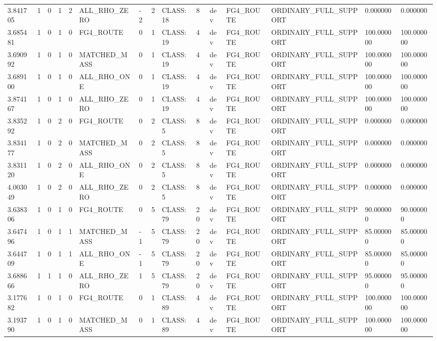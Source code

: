 \begin{tabular}{lllllllllllllll}
3.841705 & 1 & 0 & 1 & 2 & ALL\_RHO\_ZERO & -2 & 2 & CLASS:18 & 8 & dev & FG4\_ROUTE & ORDINARY\_FULL\_SUPPORT & 0.000000 & 0.000000 \\
3.685481 & 1 & 0 & 1 & 0 & FG4\_ROUTE & 0 & 1 & CLASS:19 & 4 & dev & FG4\_ROUTE & ORDINARY\_FULL\_SUPPORT & 100.000000 & 100.000000 \\
3.690992 & 1 & 0 & 1 & 0 & MATCHED\_MASS & 0 & 1 & CLASS:19 & 4 & dev & FG4\_ROUTE & ORDINARY\_FULL\_SUPPORT & 100.000000 & 100.000000 \\
3.689100 & 1 & 0 & 1 & 0 & ALL\_RHO\_ONE & 0 & 1 & CLASS:19 & 4 & dev & FG4\_ROUTE & ORDINARY\_FULL\_SUPPORT & 100.000000 & 100.000000 \\
3.874167 & 1 & 0 & 1 & 0 & ALL\_RHO\_ZERO & 0 & 1 & CLASS:19 & 4 & dev & FG4\_ROUTE & ORDINARY\_FULL\_SUPPORT & 100.000000 & 100.000000 \\
3.835292 & 1 & 0 & 2 & 0 & FG4\_ROUTE & 0 & 2 & CLASS:5 & 8 & dev & FG4\_ROUTE & ORDINARY\_FULL\_SUPPORT & 0.000000 & 0.000000 \\
3.834177 & 1 & 0 & 2 & 0 & MATCHED\_MASS & 0 & 2 & CLASS:5 & 8 & dev & FG4\_ROUTE & ORDINARY\_FULL\_SUPPORT & 0.000000 & 0.000000 \\
3.831120 & 1 & 0 & 2 & 0 & ALL\_RHO\_ONE & 0 & 2 & CLASS:5 & 8 & dev & FG4\_ROUTE & ORDINARY\_FULL\_SUPPORT & 0.000000 & 0.000000 \\
4.003049 & 1 & 0 & 2 & 0 & ALL\_RHO\_ZERO & 0 & 2 & CLASS:5 & 8 & dev & FG4\_ROUTE & ORDINARY\_FULL\_SUPPORT & 0.000000 & 0.000000 \\
3.638306 & 1 & 0 & 1 & 0 & FG4\_ROUTE & 0 & 5 & CLASS:79 & 20 & dev & FG4\_ROUTE & ORDINARY\_FULL\_SUPPORT & 90.000000 & 90.000000 \\
3.647496 & 1 & 0 & 1 & 1 & MATCHED\_MASS & -1 & 5 & CLASS:79 & 20 & dev & FG4\_ROUTE & ORDINARY\_FULL\_SUPPORT & 85.000000 & 85.000000 \\
3.644709 & 1 & 0 & 1 & 1 & ALL\_RHO\_ONE & -1 & 5 & CLASS:79 & 20 & dev & FG4\_ROUTE & ORDINARY\_FULL\_SUPPORT & 85.000000 & 85.000000 \\
3.688666 & 1 & 1 & 1 & 0 & ALL\_RHO\_ZERO & 1 & 5 & CLASS:79 & 20 & dev & FG4\_ROUTE & ORDINARY\_FULL\_SUPPORT & 95.000000 & 95.000000 \\
3.177682 & 1 & 0 & 1 & 0 & FG4\_ROUTE & 0 & 1 & CLASS:89 & 4 & dev & FG4\_ROUTE & ORDINARY\_FULL\_SUPPORT & 100.000000 & 100.000000 \\
3.193790 & 1 & 0 & 1 & 0 & MATCHED\_MASS & 0 & 1 & CLASS:89 & 4 & dev & FG4\_ROUTE & ORDINARY\_FULL\_SUPPORT & 100.000000 & 100.000000 \\

\end{tabular}
